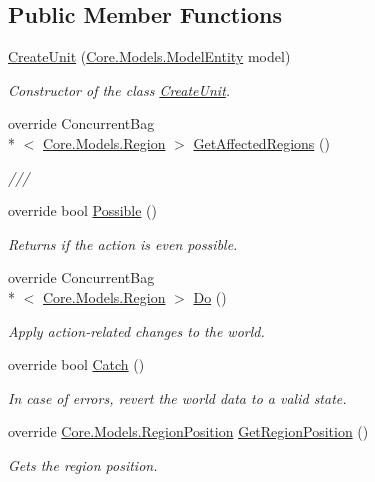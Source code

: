 \subsection*{Public Member Functions}
\begin{DoxyCompactItemize}
\item 
\hyperlink{classCore_1_1Controllers_1_1Actions_1_1CreateUnit_a38e1f619d2ec42c361d1ab532b04b2cb}{Create\-Unit} (\hyperlink{classCore_1_1Models_1_1ModelEntity}{Core.\-Models.\-Model\-Entity} model)
\begin{DoxyCompactList}\small\item\em Constructor of the class \hyperlink{classCore_1_1Controllers_1_1Actions_1_1CreateUnit}{Create\-Unit}. \end{DoxyCompactList}\item 
override Concurrent\-Bag\\*
$<$ \hyperlink{classCore_1_1Models_1_1Region}{Core.\-Models.\-Region} $>$ \hyperlink{classCore_1_1Controllers_1_1Actions_1_1CreateUnit_a740be9051fcd4f9a8e22d702da400ba7}{Get\-Affected\-Regions} ()
\begin{DoxyCompactList}\small\item\em /// \end{DoxyCompactList}\item 
override bool \hyperlink{classCore_1_1Controllers_1_1Actions_1_1CreateUnit_a30ceafb2aa0fb1b801a8abd659c9d70f}{Possible} ()
\begin{DoxyCompactList}\small\item\em Returns if the action is even possible. \end{DoxyCompactList}\item 
override Concurrent\-Bag\\*
$<$ \hyperlink{classCore_1_1Models_1_1Region}{Core.\-Models.\-Region} $>$ \hyperlink{classCore_1_1Controllers_1_1Actions_1_1CreateUnit_a0afdf65e7e04f108bb257eae3327eac0}{Do} ()
\begin{DoxyCompactList}\small\item\em Apply action-\/related changes to the world. \end{DoxyCompactList}\item 
override bool \hyperlink{classCore_1_1Controllers_1_1Actions_1_1CreateUnit_ac2763a79e6767ac7c5179281cb4e0a6f}{Catch} ()
\begin{DoxyCompactList}\small\item\em In case of errors, revert the world data to a valid state. \end{DoxyCompactList}\item 
override \hyperlink{classCore_1_1Models_1_1RegionPosition}{Core.\-Models.\-Region\-Position} \hyperlink{classCore_1_1Controllers_1_1Actions_1_1CreateUnit_a04a85d0db9c84ca3f0e97049cca4f9c0}{Get\-Region\-Position} ()
\begin{DoxyCompactList}\small\item\em Gets the region position. \end{DoxyCompactList}\end{DoxyCompactItemize}
